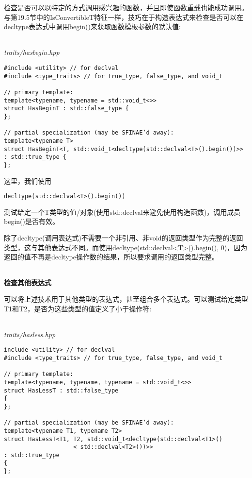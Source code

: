 检查是否可以以特定的方式调用感兴趣的函数，并且即使函数重载也能成功调用。与第19.5节中的IsConvertibleT特征一样，技巧在于构造表达式来检查是否可以在decltype表达式中调用begin()来获取函数模板参数的默认值:

\hspace*{\fill} \\ %
\noindent
\textit{traits/hasbegin.hpp}
\begin{lstlisting}[style=styleCXX]
#include <utility> // for declval
#include <type_traits> // for true_type, false_type, and void_t

// primary template:
template<typename, typename = std::void_t<>>
struct HasBeginT : std::false_type {
};

// partial specialization (may be SFINAE’d away):
template<typename T>
struct HasBeginT<T, std::void_t<decltype(std::declval<T>().begin())>>
: std::true_type {
};
\end{lstlisting}

这里，我们使用

\begin{lstlisting}[style=styleCXX]
decltype(std::declval<T>().begin())
\end{lstlisting}

测试给定一个T类型的值/对象(使用std::declval来避免使用构造函数)，调用成员begin()是否有效。

\begin{tcolorbox}[colback=webgreen!5!white,colframe=webgreen!75!black]
\hspace*{0.75cm}除了decltype(调用表达式)不需要一个非引用、非void的返回类型作为完整的返回类型，这与其他表达式不同。而使用decltype(std::declval<T>().begin(), 0)，因为返回的值不再是decltype操作数的结果，所以要求调用的返回类型完整。
\end{tcolorbox}

\hspace*{\fill} \\ %
\noindent
\textbf{检查其他表达式}

可以将上述技术用于其他类型的表达式，甚至组合多个表达式。可以测试给定类型T1和T2，是否为这些类型的值定义了小于操作符:

\hspace*{\fill} \\ %
\noindent
\textit{traits/hasless.hpp}
\begin{lstlisting}[style=styleCXX]
include <utility> // for declval
#include <type_traits> // for true_type, false_type, and void_t

// primary template:
template<typename, typename, typename = std::void_t<>>
struct HasLessT : std::false_type
{
};

// partial specialization (may be SFINAE’d away):
template<typename T1, typename T2>
struct HasLessT<T1, T2, std::void_t<decltype(std::declval<T1>()
					< std::declval<T2>())>>
: std::true_type
{
};
\end{lstlisting}

